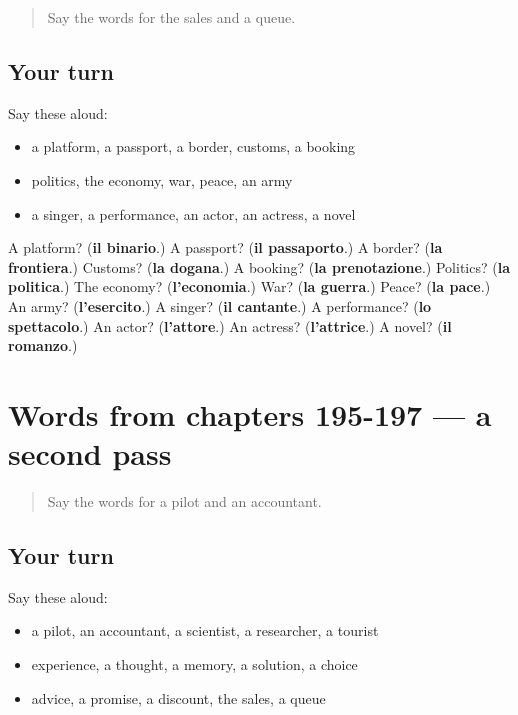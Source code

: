 \begin{quote}
Say the words for the sales and a queue.
\end{quote}

\subsection*{Your turn}
Say these aloud:

\begin{itemize}
\raggedright
  \item a platform, a passport, a border, customs, a booking
  \item politics, the economy, war, peace, an army
  \item a singer, a performance, an actor, an actress, a novel
\end{itemize}

\begin{tcolorbox}[breakable,colback=teal!4,colframe=teal!35!black,title={Before you move on}]
A platform? (\textbf{il binario}.) A passport? (\textbf{il passaporto}.) A border? (\textbf{la frontiera}.) Customs? (\textbf{la dogana}.) A booking? (\textbf{la prenotazione}.) Politics? (\textbf{la politica}.) The economy? (\textbf{l'economia}.) War? (\textbf{la guerra}.) Peace? (\textbf{la pace}.) An army? (\textbf{l'esercito}.) A singer? (\textbf{il cantante}.) A performance? (\textbf{lo spettacolo}.) An actor? (\textbf{l'attore}.) An actress? (\textbf{l'attrice}.) A novel? (\textbf{il romanzo}.)
\end{tcolorbox}
\section[(dialogue)]{Words from chapters 195-197 — a second pass}

\label{lesson:IT-R197-second-pass-words-from-chapters-195-197}



\begin{quote}
Say the words for a pilot and an accountant.
\end{quote}

\subsection*{Your turn}
Say these aloud:

\begin{itemize}
\raggedright
  \item a pilot, an accountant, a scientist, a researcher, a tourist
  \item experience, a thought, a memory, a solution, a choice
  \item advice, a promise, a discount, the sales, a queue
\end{itemize}

